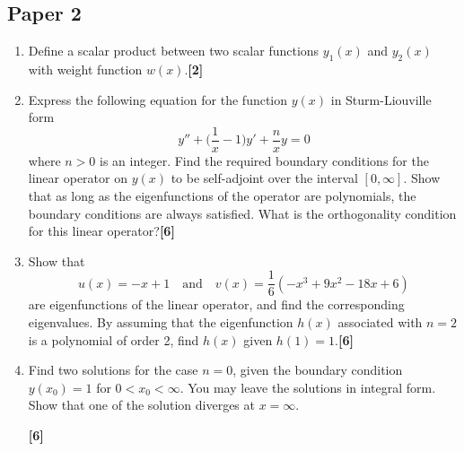 \documentclass[a4paper]{article}
\begin{document}
\subsection{Paper 2}
\begin{qns}\leavevmode
\begin{enumerate}[label=(\roman*)]
\item Define a scalar product between two scalar functions $y_1(x)$ and $y_2(x)$ with weight
function $w(x)$.\hfill\textbf{[2]}
\item Express the following equation for the function $y(x)$ in Sturm-Liouville form
$$y''+\bigg(\frac{1}{x}-1\bigg)y'+\frac{n}{x}y=0$$
where $n > 0$ is an integer. Find the required boundary conditions for the linear operator on $y(x)$ to be self-adjoint over the interval $[0,\infty]$. Show that as long as the eigenfunctions of the operator are polynomials, the boundary conditions are always satisfied. What is
the orthogonality condition for this linear operator?\hfill\textbf{[6]}
\item Show that
$$u(x) = −x + 1\quad\text{and}\quad v(x) =\frac{1}{6}(-x^3+9x^2-18x+6)$$
are eigenfunctions of the linear operator, and find the corresponding eigenvalues. By assuming that the eigenfunction $h(x)$ associated with $n = 2$ is a polynomial of order 2, find $h(x)$ given $h(1) = 1$.\hfill\textbf{[6]}
\item Find two solutions for the case $n = 0$, given the boundary condition $y(x_0) = 1$ for $0 < x_0 <\infty$. You may leave the solutions in integral form. Show that one of the solution diverges at $x = \infty$.

\hfill\textbf{[6]}
\end{enumerate}
\end{qns}
\end{document}

